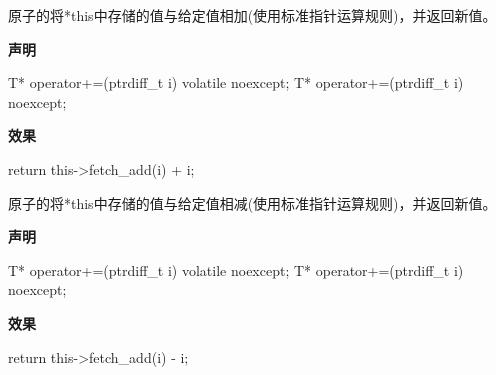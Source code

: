 
原子的将*this中存储的值与给定值相加(使用标准指针运算规则)，并返回新值。

\textbf{声明}

\begin{cpp}
T* operator+=(ptrdiff_t i) volatile noexcept;
T* operator+=(ptrdiff_t i) noexcept;
\end{cpp}

\textbf{效果}

\begin{cpp}
return this->fetch_add(i) + i;
\end{cpp}



原子的将*this中存储的值与给定值相减(使用标准指针运算规则)，并返回新值。

\textbf{声明}

\begin{cpp}
T* operator+=(ptrdiff_t i) volatile noexcept;
T* operator+=(ptrdiff_t i) noexcept;
\end{cpp}

\textbf{效果}

\begin{cpp}
return this->fetch_add(i) - i;
\end{cpp}